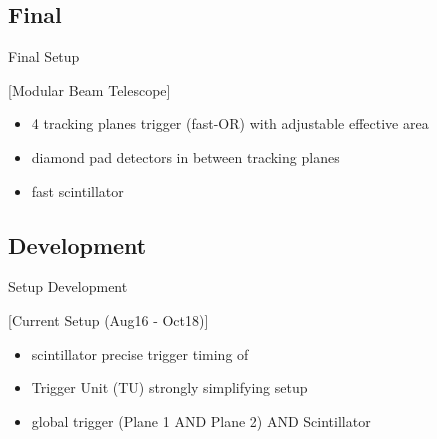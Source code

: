 \subsection{Final}
\begin{frame}{Final Setup}

	[Modular Beam Telescope]\vspace{-10pt}

	\begin{itemize}\itemfill
		\item 4 tracking planes \ra trigger (fast-OR) with adjustable effective area
		\item diamond pad detectors in between tracking planes
		\item fast scintillator 
	\end{itemize}

\end{frame}
\subsection{Development}
\begin{frame}{Setup Development}

	[Current Setup (Aug16 - Oct18)]\vspace{-10pt}
	
	\begin{itemize}\itemfill
		\item scintillator \ra precise trigger timing of 
		\item Trigger Unit (TU) \ra strongly simplifying setup
		\item global trigger \ra (Plane 1 AND Plane 2) AND Scintillator
	\end{itemize}
	
\end{frame}
